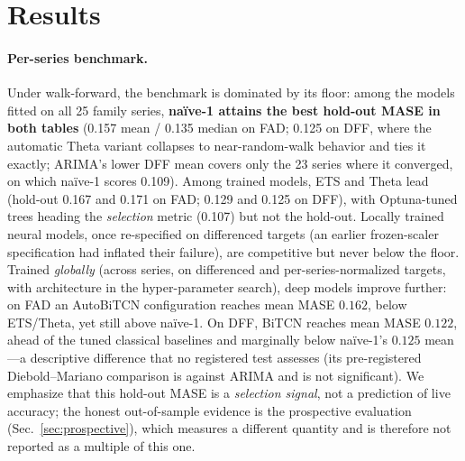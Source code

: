 \documentclass[runningheads]{llncs}
\begin{document}
\section{Results}
\label{sec:results}

\paragraph{Per-series benchmark.} Under walk-forward, the benchmark is dominated by
its floor: among the models fitted on all 25 family series, \textbf{naïve-1 attains the
best hold-out MASE in both tables} (0.157 mean / 0.135 median on FAD; 0.125 on DFF, where
the automatic Theta variant collapses to near-random-walk behavior and ties it exactly;
ARIMA's lower DFF mean covers only the 23 series where it converged, on which naïve-1
scores 0.109). Among trained models, ETS and Theta lead (hold-out 0.167 and 0.171 on
FAD; 0.129 and 0.125 on DFF), with Optuna-tuned trees heading the \emph{selection}
metric (0.107) but not the hold-out. Locally trained neural models, once re-specified on differenced targets
(an earlier frozen-scaler specification had inflated their failure), are
competitive but never below the floor. Trained \emph{globally} (across series, on
differenced and per-series-normalized targets, with architecture in the
hyper-parameter search), deep models improve further: on FAD an AutoBiTCN
configuration reaches mean MASE $0.162$, below ETS/Theta, yet still above naïve-1. On
DFF, BiTCN reaches mean MASE $0.122$, ahead of the tuned classical baselines and
marginally below naïve-1's $0.125$ mean---a descriptive difference that no registered
test assesses (its pre-registered Diebold--Mariano comparison is against ARIMA and is
not significant). We emphasize that this hold-out MASE is a \emph{selection signal},
not a prediction of live accuracy; the honest out-of-sample evidence is the prospective
evaluation (Sec.~\ref{sec:prospective}), which measures a different quantity and is
therefore not reported as a multiple of this one.
\end{document}
